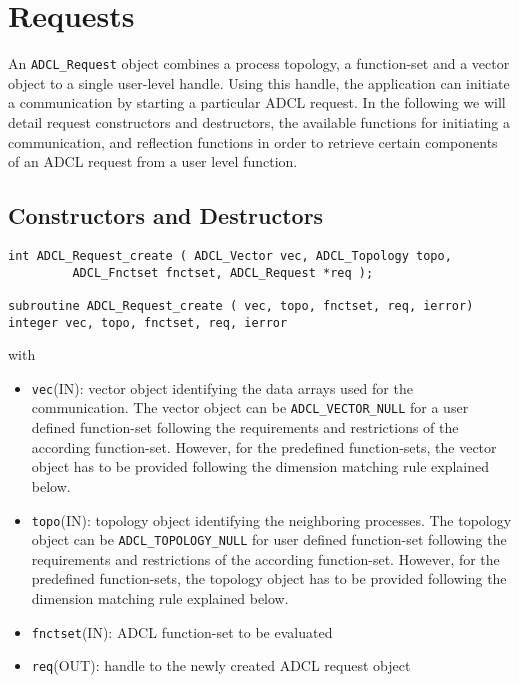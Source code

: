\section{Requests}
\label{sec:requests}

An {\tt ADCL\_Request} object combines a process topology, a function-set and
a vector object to a single user-level handle. Using this handle, the
application can initiate a communication by starting a particular ADCL
request. In the following we will detail request constructors and destructors,
the available functions for initiating a communication, and reflection
functions in order to retrieve certain components of an ADCL request from a
user level function.

\subsection{Constructors and Destructors}

\begin{verbatim}
int ADCL_Request_create ( ADCL_Vector vec, ADCL_Topology topo, 
         ADCL_Fnctset fnctset, ADCL_Request *req );

subroutine ADCL_Request_create ( vec, topo, fnctset, req, ierror)
integer vec, topo, fnctset, req, ierror
\end{verbatim}
with
\begin{itemize}
\item {\tt vec}(IN): vector object identifying the data arrays used for the
  communication. The vector object can be {\tt ADCL\_VECTOR\_NULL} for a user
  defined function-set following the requirements and restrictions of the
  according function-set. However, for the predefined function-sets, the
  vector object has to be provided following the dimension matching rule
  explained below.
\item {\tt topo}(IN): topology object identifying the neighboring processes.
  The topology object can be {\tt ADCL\_TOPOLOGY\_NULL} for user defined
  function-set following the requirements and restrictions of the according
  function-set. However, for the predefined function-sets, the topology object
  has to be provided following the dimension matching rule explained below.
\item {\tt fnctset}(IN): ADCL function-set to be evaluated
\item {\tt req}(OUT): handle to the newly created ADCL request object
\end{itemize}
\hspace{1cm}

